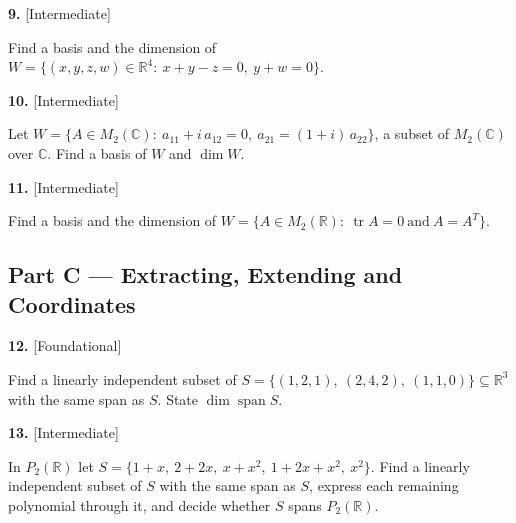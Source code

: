 \documentclass[11pt]{article}
\begin{document}
\begin{minipage}{\linewidth}\textbf{9.} \hfill{\scriptsize\color{ink}[Intermediate]}\par\nopagebreak Find a basis and the dimension of $W=\{(x,y,z,w)\in\mathbb{R}^{4}:\ x+y-z=0,\ y+w=0\}$.
\vspace{4.1cm}\end{minipage}\par\vspace{4pt}
\begin{minipage}{\linewidth}\textbf{10.} \hfill{\scriptsize\color{ink}[Intermediate]}\par\nopagebreak Let $W=\{A\in M_2(\mathbb{C}):\ a_{11}+i\,a_{12}=0,\ a_{21}=(1+i)\,a_{22}\}$, a subset of $M_2(\mathbb{C})$ over $\mathbb{C}$. Find a basis of $W$ and $\dim W$.
\vspace{4.3cm}\end{minipage}\par\vspace{4pt}
\begin{minipage}{\linewidth}\textbf{11.} \hfill{\scriptsize\color{ink}[Intermediate]}\par\nopagebreak Find a basis and the dimension of $W=\{A\in M_2(\mathbb{R}):\ \operatorname{tr}A=0\ \text{and}\ A=A^{T}\}$.
\vspace{4.1cm}\end{minipage}\par\vspace{4pt}
\subsection*{\normalsize\color{ink} Part C --- Extracting, Extending and Coordinates}
\begin{minipage}{\linewidth}\textbf{12.} \hfill{\scriptsize\color{ink}[Foundational]}\par\nopagebreak Find a linearly independent subset of $S=\{(1,2,1),\ (2,4,2),\ (1,1,0)\}\subseteq\mathbb{R}^{3}$ with the same span as $S$. State $\dim\operatorname{span}S$.
\vspace{3.8cm}\end{minipage}\par\vspace{4pt}
\begin{minipage}{\linewidth}\textbf{13.} \hfill{\scriptsize\color{ink}[Intermediate]}\par\nopagebreak In $P_2(\mathbb{R})$ let $S=\{1+x,\ 2+2x,\ x+x^{2},\ 1+2x+x^{2},\ x^{2}\}$. Find a linearly independent subset of $S$ with the same span as $S$, express each remaining polynomial through it, and decide whether $S$ spans $P_2(\mathbb{R})$.
\vspace{5.1cm}\end{minipage}\par\vspace{4pt}
\end{document}
